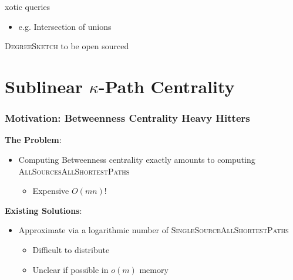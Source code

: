 \documentclass{beamer}
\newcommand{\algoname}[1]{\textnormal{\textsc{#1}}}
\begin{document}
\begin{frame}
\begin{itemize}
xotic queries
	\begin{itemize}
		\item e.g. Intersection of unions
	\end{itemize}
\end{itemize}

\begin{block}{}
	\begin{center}
		\algoname{DegreeSketch} to be open sourced	
	\end{center}
\end{block}

\end{frame}


\section{Sublinear $\kappa$-Path Centrality}


\begin{frame}
\frametitle{Motivation: Betweenness Centrality Heavy Hitters}

\textbf{The Problem}:
\begin{itemize}
	\item Computing Betweenness centrality exactly amounts to computing \algoname{AllSourcesAllShortestPaths}
	\begin{itemize}
		\item Expensive $O(mn)$!
	\end{itemize}
\end{itemize}
\textbf{Existing Solutions}:
\begin{itemize}
	\item Approximate via a logarithmic number of \algoname{SingleSourceAllShortestPaths} \cite{green2012fast, bergamini2014approximating, yoshida2014almost, kourtellis2015scalable, riondato2016fast}
	\begin{itemize}
		\item Difficult to distribute
		\item Unclear if possible in $o(m)$ memory
	\end{itemize}
\end{itemize}


\end{frame}
\end{document}
